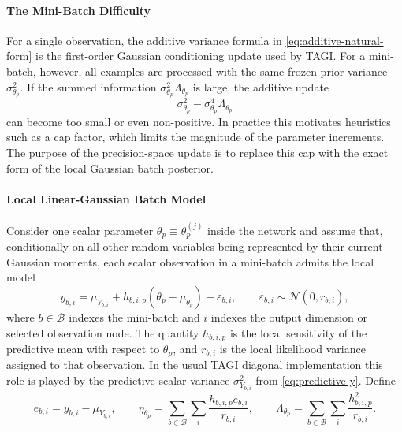 \documentclass[11pt]{article}
\begin{document}
\paragraph{The Mini-Batch Difficulty}
For a single observation, the additive variance formula in
\eqref{eq:additive-natural-form} is the first-order Gaussian conditioning
update used by TAGI. For a mini-batch, however, all examples are processed
with the same frozen prior variance
\(
\sigma^2_{\theta_p}
\).
If the summed information
\(
\sigma^2_{\theta_p}\Lambda_{\theta_p}
\)
is large, the additive update
\[
    \sigma^2_{\theta_p}
    -
    \sigma^4_{\theta_p}\Lambda_{\theta_p}
\]
can become too small or even non-positive. In practice this motivates
heuristics such as a cap factor, which limits the magnitude of the parameter
increments. The purpose of the precision-space update is to replace this cap
with the exact form of the local Gaussian batch posterior.

\paragraph{Local Linear-Gaussian Batch Model}
Consider one scalar parameter
\(
\theta_p
\equiv \theta_p^{(j)}
\)
inside the network and assume that, conditionally on all other random
variables being represented by their current Gaussian moments, each scalar
observation in a mini-batch admits the local model
\begin{equation}
    y_{b,i}
    =
    \mu_{Y_{b,i}}
    +
    h_{b,i,p}(\theta_p-\mu_{\theta_p})
    +
    \varepsilon_{b,i},
    \qquad
    \varepsilon_{b,i}
    \sim
    \mathcal{N}(0,r_{b,i}),
    \label{eq:local-linear-model}
\end{equation}
where
\(
b\in\mathcal{B}
\)
indexes the mini-batch and
\(
i
\)
indexes the output dimension or selected observation node. The quantity
\(
h_{b,i,p}
\)
is the local sensitivity of the predictive mean with respect to
\(
\theta_p
\),
and
\(
r_{b,i}
\)
is the local likelihood variance assigned to that observation. In the usual
TAGI diagonal implementation this role is played by the predictive scalar
variance
\(
\sigma^2_{Y_{b,i}}
\)
from \eqref{eq:predictive-y}. Define
\begin{equation}
    e_{b,i}
    =
    y_{b,i}-\mu_{Y_{b,i}},
    \qquad
    \eta_{\theta_p}
    =
    \sum_{b\in\mathcal{B}}\sum_i
    \frac{h_{b,i,p}e_{b,i}}{r_{b,i}},
    \qquad
    \Lambda_{\theta_p}
    =
    \sum_{b\in\mathcal{B}}\sum_i
    \frac{h_{b,i,p}^2}{r_{b,i}}.
    \label{eq:eta-lambda}
\end{equation}
\end{document}

